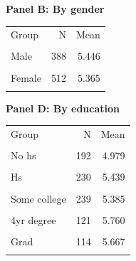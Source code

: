 \begin{table}[htbp]
\begin{minipage}[t]{0.48\textwidth}
\textbf{Panel B: By gender}\\[0.3em]
\begin{tabular}{lrr}\toprule
Group & N & Mean \\\\ \midrule
Male & 388 & 5.446 \\\\
Female & 512 & 5.365 \\\\
\bottomrule
\end{tabular}
\end{minipage}\hfill
\begin{minipage}[t]{0.48\textwidth}\centering
\textbf{Panel D: By education}\\[0.3em]
\begin{tabular}{lrr}\toprule
Group & N & Mean \\\\ \midrule
No hs & 192 & 4.979 \\\\
Hs & 230 & 5.439 \\\\
Some college & 239 & 5.385 \\\\
4yr degree & 121 & 5.760 \\\\
Grad & 114 & 5.667 \\\\
\bottomrule
\end{tabular}
\end{minipage}
\end{table}
